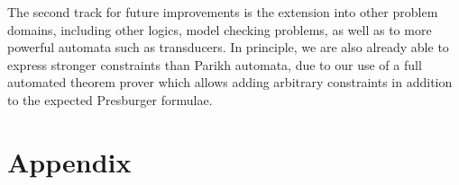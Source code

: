 \documentclass[acmsmall,review,anonymous,screen]{acmart}\settopmatter{printfolios=true,printccs=true,printacmref=true}
\theoremstyle{definition}
\begin{document}
The second track for future improvements is the extension into other problem
domains, including other logics, model checking problems, as well as to more
powerful automata such as transducers. In principle, we are also already able to
express stronger constraints than Parikh automata, due to our use of a full
automated theorem prover which allows adding arbitrary constraints in addition
to the expected Presburger formulae.






\appendix
\section{Appendix}

\end{document}
